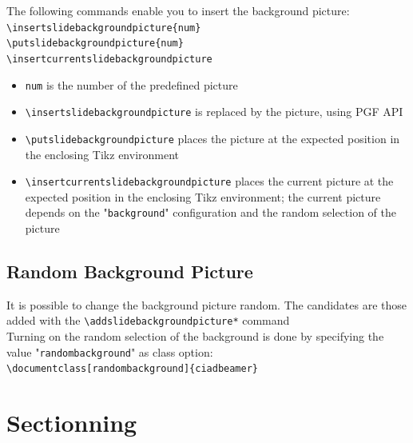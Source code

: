 \documentclass[english,sectioncirclenumberstyle]{ciadbeamer}
\begin{document}
\begin{frame}{\subsecname}
	The following commands enable you to insert the background picture: \\[.25cm]
	\texttt{{\textbackslash}insertslidebackgroundpicture\{num\}} \\[.25cm]
	\texttt{{\textbackslash}putslidebackgroundpicture\{num\}} \\[.25cm]
	\texttt{{\textbackslash}insertcurrentslidebackgroundpicture} \\[.25cm]
	\begin{itemize}
		\item \texttt{num} is the number of the predefined picture
		\item \texttt{{\textbackslash}insertslidebackgroundpicture} is replaced by the picture, using PGF API
		\item \texttt{{\textbackslash}putslidebackgroundpicture} places the picture at the expected position in the enclosing Tikz environment
		\item \texttt{{\textbackslash}insertcurrentslidebackgroundpicture} places the current picture at the expected position in the enclosing Tikz environment; the current picture depends on the "\texttt{background}" configuration and the random selection of the picture
	\end{itemize}
\end{frame}

\subsection{Random Background Picture}

\begin{frame}{\subsecname}
	It is possible to change the background picture random. The candidates are those added with the \texttt{{\textbackslash}addslidebackgroundpicture*} command \\[.25cm]
	Turning on the random selection of the background is done by specifying the value "\texttt{randombackground}" as class option: \\[.25cm]
	\texttt{{\textbackslash}documentclass[randombackground]\{ciadbeamer\}}
\end{frame}



\section{Sectionning}
\sectiontableofcontentslide
\end{document}
